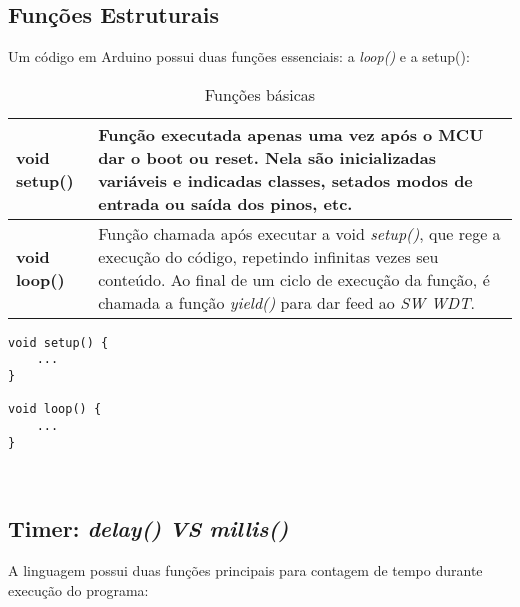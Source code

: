 \documentclass[
	11pt,				%
	openright,			%
	twoside,			%
	a5paper,			%
	english,			%
	french,				%
	spanish,			%
	brazil,				%
	sumario=tradicional
]{abntex2}
\begin{document}
\subsection{Funções Estruturais}
    Um código em Arduino possui duas funções essenciais: a \textit{loop()} e a setup():
    
    \begin{table}[!ht]
\centering
\label{Funcoes-basicas}
\caption{Funções básicas}
\footnotesize{
\begin{tabular}{>{\bfseries}lp{5.35cm}}
\toprule

void setup() & Função executada apenas uma vez após o MCU dar o boot ou reset. Nela são inicializadas variáveis e indicadas classes, setados modos de entrada ou saída dos pinos, etc. \\\midrule
void loop() & Função chamada após executar a void \textit{setup()}, que rege a execução do código, repetindo infinitas vezes seu conteúdo. Ao final de um ciclo de execução da função, é chamada a função \textit{yield()} para dar feed ao \emph{SW WDT}. \\\bottomrule
\end{tabular}
}
\end{table}
    
       \begin{lstlisting} 
void setup() {
    ...
}
    
void loop() {
    ...
}
    
        
\end{lstlisting}

    
\subsection{Timer: \textit{delay()} {\normalsize{\emph{VS}}} \textit{millis()}}
    A linguagem possui duas funções principais para contagem de tempo durante execução do programa:
    
\end{document}
